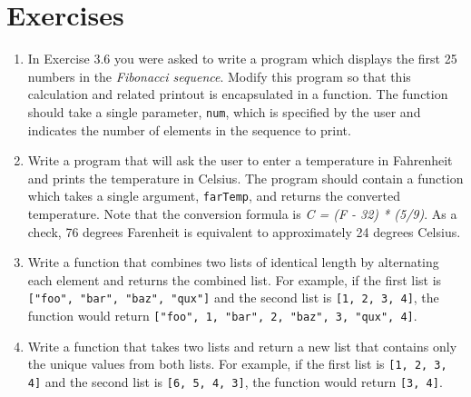 \documentclass{book}
\begin{document}
\section{Exercises}
\begin{enumerate}
	\item In Exercise 3.6 you were asked to write a program which displays the first 25 numbers in the \textit{Fibonacci sequence}. Modify this program so that this calculation and related printout is encapsulated in a function. The function should take a single parameter, \texttt{num}, which is specified by the user and indicates the number of elements in the sequence to print. 
	
	\item Write a program that will ask the user to enter a temperature in Fahrenheit and prints the temperature in Celsius. The program should contain a function which takes a single argument, \texttt{farTemp}, and returns the converted temperature. Note that the conversion formula is \textit{C = (F - 32) * (5/9)}. As a check, 76 degrees Farenheit is equivalent to approximately 24 degrees Celsius.
	
	\item Write a function that combines two lists of identical length by alternating each element and returns the combined list. For example, if the first list is \texttt{["foo", "bar", "baz", "qux"]} and the second list is \texttt{[1, 2, 3, 4]}, the function would return \texttt{["foo", 1, "bar", 2, "baz", 3, "qux", 4]}.
	
	\item Write a function that takes two lists and return a new list that contains only the unique values from both lists. For example, if the first list is \texttt{[1, 2, 3, 4]} and the second list is \texttt{[6, 5, 4, 3]}, the function would return \texttt{[3, 4]}.

\end{enumerate}
\end{document}
